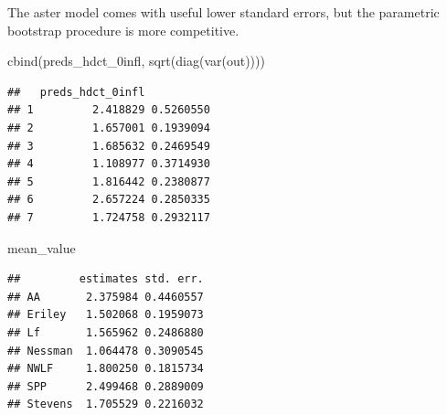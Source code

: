 \documentclass[
  ignorenonframetext,
]{beamer}
\newenvironment{Shaded}{\begin{snugshade}}{\end{snugshade}}
\newcommand{\FunctionTok}[1]{\textcolor[rgb]{0.00,0.00,0.00}{#1}}
\newcommand{\NormalTok}[1]{#1}
\begin{document}
\begin{frame}[fragile]{}
\protect\hypertarget{section-49}{}
The aster model comes with useful lower standard errors, but the
parametric bootstrap procedure is more competitive.

\vspace{12pt}
\tiny

\begin{Shaded}
\begin{Highlighting}[]
\FunctionTok{cbind}\NormalTok{(preds\_hdct\_0infl, }\FunctionTok{sqrt}\NormalTok{(}\FunctionTok{diag}\NormalTok{(}\FunctionTok{var}\NormalTok{(out))))}
\end{Highlighting}
\end{Shaded}

\begin{verbatim}
##   preds_hdct_0infl          
## 1         2.418829 0.5260550
## 2         1.657001 0.1939094
## 3         1.685632 0.2469549
## 4         1.108977 0.3714930
## 5         1.816442 0.2380877
## 6         2.657224 0.2850335
## 7         1.724758 0.2932117
\end{verbatim}

\begin{Shaded}
\begin{Highlighting}[]
\NormalTok{mean\_value}
\end{Highlighting}
\end{Shaded}

\begin{verbatim}
##         estimates std. err.
## AA       2.375984 0.4460557
## Eriley   1.502068 0.1959073
## Lf       1.565962 0.2486880
## Nessman  1.064478 0.3090545
## NWLF     1.800250 0.1815734
## SPP      2.499468 0.2889009
## Stevens  1.705529 0.2216032
\end{verbatim}
\end{frame}
\end{document}
